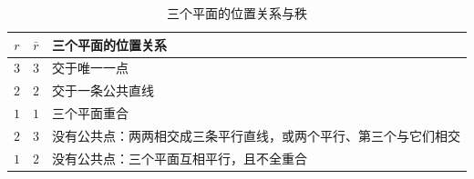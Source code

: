 \documentclass[lang=cn,10.5pt,scheme=chinese,toc=twocol,section,chinesefont=nofont,
twoside,citestyle=gb7714-2015,bibstyle=gb7714-2015]{elegantbook}
\numberwithin{equation}{section}   %
\begin{document}
\begin{table}[htbp]
  \centering
  \begin{tabular}{ccl}
    \toprule
    $r$ & $\bar r$ & 三个平面的位置关系                        \\
    \midrule
    $3$ & $3$      & 交于唯一一点                           \\
    $2$ & $2$      & 交于一条公共直线                         \\
    $1$ & $1$      & 三个平面重合                           \\
    $2$ & $3$      & 没有公共点：两两相交成三条平行直线，或两个平行、第三个与它们相交 \\
    $1$ & $2$      & 没有公共点：三个平面互相平行，且不全重合             \\
    \bottomrule
  \end{tabular}
  \caption{三个平面的位置关系与秩}
  \label{tab:threeplanes}
\end{table}
\end{document}

